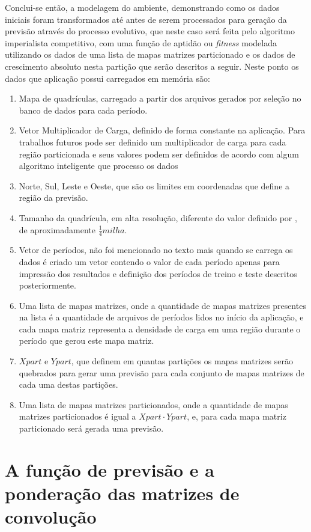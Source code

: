 Conclui-se então, a modelagem do ambiente, demonstrando como os dados iniciais foram transformados até antes de serem processados para geração da previsão através do processo evolutivo, que neste caso será feita pelo algoritmo imperialista competitivo, com uma função de aptidão ou \emph{fitness} modelada utilizando os dados de uma lista de mapas matrizes particionado e os dados de crescimento absoluto nesta partição que serão descritos a seguir. Neste ponto os dados que aplicação possui carregados em memória são:
\begin{enumerate}
\item Mapa de quadrículas, carregado a partir dos arquivos gerados por seleção no banco de dados para cada período.
\item Vetor Multiplicador de Carga, definido de forma constante na aplicação. Para trabalhos futuros pode ser definido um multiplicador de carga para cada região particionada e seus valores podem ser definidos de acordo com algum algoritmo inteligente que processo os dados
\item Norte, Sul, Leste e Oeste, que são os limites em coordenadas que define a região da previsão.
\item Tamanho da quadrícula, em alta resolução, diferente do valor definido por \citeauthor{willis2002spatial}, de aproximadamente \(\frac{1}{4} milha\).
\item Vetor de períodos, não foi mencionado no texto mais quando se carrega os dados é criado um vetor contendo o valor de cada período apenas para impressão dos resultados  e definição dos períodos de treino e teste descritos posteriormente.
\item Uma lista de mapas matrizes, onde a quantidade de mapas matrizes presentes na lista é a quantidade de arquivos de períodos lidos no início da aplicação, e cada mapa matriz representa a densidade de carga em uma região durante o período que gerou este mapa matriz.
\item \(Xpart\) e \(Ypart\), que definem em quantas partições os mapas matrizes  serão quebrados para gerar uma previsão para cada conjunto de mapas matrizes de cada  uma destas partições.
\item Uma lista de mapas matrizes particionados, onde a quantidade de mapas matrizes particionados é igual a \(Xpart \cdot Ypart\),  e, para cada mapa matriz particionado será gerada uma previsão. 
\end{enumerate}




\section{A função de previsão e a ponderação das matrizes de convolução}
\label{A função de previsão e a ponderação das matrizes de convolução}


